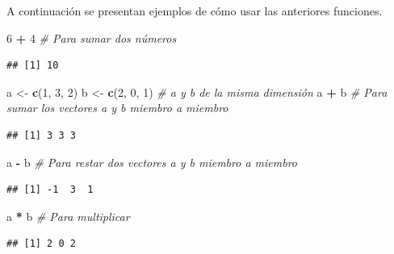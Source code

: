 \documentclass[10pt,]{krantz}
\makeatletter
\newenvironment{Shaded}{\begin{snugshade}}{\end{snugshade}}
\newcommand{\KeywordTok}[1]{\textcolor[rgb]{0.13,0.29,0.53}{\textbf{#1}}}
\newcommand{\DecValTok}[1]{\textcolor[rgb]{0.00,0.00,0.81}{#1}}
\newcommand{\StringTok}[1]{\textcolor[rgb]{0.31,0.60,0.02}{#1}}
\newcommand{\CommentTok}[1]{\textcolor[rgb]{0.56,0.35,0.01}{\textit{#1}}}
\newcommand{\OperatorTok}[1]{\textcolor[rgb]{0.81,0.36,0.00}{\textbf{#1}}}
\newcommand{\NormalTok}[1]{#1}
\newenvironment{kframe}{%
\medskip{}
\setlength{\fboxsep}{.8em}
 \def\at@end@of@kframe{}%
 \ifinner\ifhmode%
  \def\at@end@of@kframe{\end{minipage}}%
  \begin{minipage}{\columnwidth}%
 \fi\fi%
 \def\FrameCommand##1{\hskip\@totalleftmargin \hskip-\fboxsep
 \colorbox{shadecolor}{##1}\hskip-\fboxsep
     \hskip-\linewidth \hskip-\@totalleftmargin \hskip\columnwidth}%
 \MakeFramed {\advance\hsize-\width
   \@totalleftmargin\z@ \linewidth\hsize
   \@setminipage}}%
 {\par\unskip\endMakeFramed%
 \at@end@of@kframe}
\renewenvironment{Shaded}{\begin{kframe}}{\end{kframe}}
\makeatother
\begin{document}
A continuación se presentan ejemplos de cómo usar las anteriores
funciones.

\begin{Shaded}
\begin{Highlighting}[]
\DecValTok{6} \OperatorTok{+}\StringTok{ }\DecValTok{4}  \CommentTok{# Para sumar dos números}
\end{Highlighting}
\end{Shaded}

\begin{verbatim}
## [1] 10
\end{verbatim}

\begin{Shaded}
\begin{Highlighting}[]
\NormalTok{a <-}\StringTok{ }\KeywordTok{c}\NormalTok{(}\DecValTok{1}\NormalTok{, }\DecValTok{3}\NormalTok{, }\DecValTok{2}\NormalTok{)}
\NormalTok{b <-}\StringTok{ }\KeywordTok{c}\NormalTok{(}\DecValTok{2}\NormalTok{, }\DecValTok{0}\NormalTok{, }\DecValTok{1}\NormalTok{)  }\CommentTok{# a y b de la misma dimensión}
\NormalTok{a }\OperatorTok{+}\StringTok{ }\NormalTok{b  }\CommentTok{# Para sumar los vectores a y b miembro a miembro}
\end{Highlighting}
\end{Shaded}

\begin{verbatim}
## [1] 3 3 3
\end{verbatim}

\begin{Shaded}
\begin{Highlighting}[]
\NormalTok{a }\OperatorTok{-}\StringTok{ }\NormalTok{b  }\CommentTok{# Para restar dos vectores a y b miembro a miembro}
\end{Highlighting}
\end{Shaded}

\begin{verbatim}
## [1] -1  3  1
\end{verbatim}

\begin{Shaded}
\begin{Highlighting}[]
\NormalTok{a }\OperatorTok{*}\StringTok{ }\NormalTok{b  }\CommentTok{# Para multiplicar}
\end{Highlighting}
\end{Shaded}

\begin{verbatim}
## [1] 2 0 2
\end{verbatim}
\end{document}
